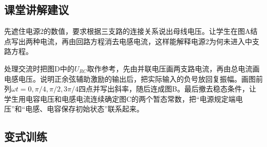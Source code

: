 \documentclass[UTF8,fontset=fandol,a4paper,11pt]{ctexart}
\begin{document}


\subsection*{课堂讲解建议}

先遮住电源2的数值，要求根据三支路的连接关系说出母线电压。让学生在图A结点写出两种电流，再由回路方程消去电感电流，这样能解释电源2为何未进入中支路方程。

处理交流时把图D中的$U_{RC}$取作参考，先由并联电压画两支路电流，再由总电流画电感电压。说明正余弦辅助激励的输出后，把实际输入的负号放回复振幅。画图前列$\omega t=0,\pi/4,\pi/2,3\pi/4$四点并写出斜率，随后连成图B。最后撤去稳态条件，让学生用电容电压和电感电流连续确定图C的两个暂态常数，把“电源规定端电压”和“电感、电容保存初始状态”联系起来。



\subsection*{变式训练}
\end{document}
